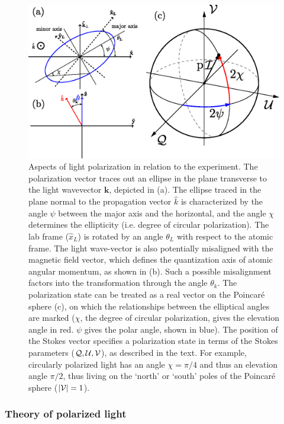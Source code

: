 	\begin{figure}
	\centering
	\includegraphics[width=\textwidth]{fig/tuneout/polz_diags}
	\caption{Aspects of light polarization in relation to the experiment. The polarization vector traces out an ellipse in the plane transverse to the light wavevector $\mathbf{k}$, depicted in (a). The ellipse traced in the plane normal to the propagation vector $\hat{k}$ is characterized by the angle $\psi$ between the major axis and the horizontal, and the angle $\chi$ determines the ellipticity (i.e. degree of circular polarization). The lab frame ($\hat{x}_L$) is rotated by an angle $\theta_L$ with respect to the atomic frame.  The light wave-vector is also potentially misaligned with the magnetic field vector, which defines the quantization axis of atomic angular momentum, as shown in (b). Such a possible misalignment factors into the transformation through the angle $\theta_k$. The polarization state can be treated as a real vector on the Poincar\'{e} sphere (c), on which the relationships between the elliptical angles are marked ($\chi$, the degree of circular polarization, gives the elevation angle in red. $\psi$ gives the polar angle, shown in blue). The position of the Stokes vector specifies a polarization state in terms of the Stokes parameters ($\mathcal{Q,U,V}$), as described in the text. For example, circularly polarized light has an angle $\chi=\pi/4$ and thus an elevation angle $\pi/2$, thus living on the `north' or `south' poles of the Poincar\'{e} sphere ($|\mathcal{V}|=1$). 
	}
	\label{fig:polz_figure}
	\end{figure}

	\subsubsection{Theory of polarized light}

